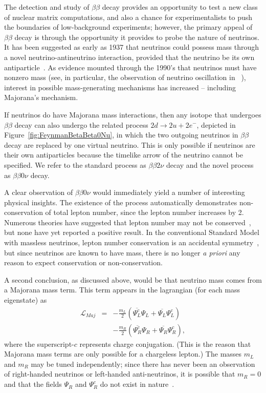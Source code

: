The detection and study of $\beta\beta$ decay provides an opportunity to test a new class of nuclear matrix computations, and also a chance for experimentalists to push the boundaries of low-background experiments; however, the primary appeal of $\beta\beta$ decay is through the opportunity it provides to probe the nature of neutrinos.  It has been suggested as early as 1937 that neutrinos could possess mass through a novel neutrino-antineutrino interaction, provided that the neutrino be its own antiparticle~\cite{Majorana}.  As evidence mounted through the 1990's that neutrinos must have nonzero mass (see, in particular, the observation of neutrino oscillation in ~\cite{SuperK}), interest in possible mass-generating mechanisms has increased -- including Majorana's mechanism.

If neutrinos do have Majorana mass interactions, then any isotope that undergoes $\beta\beta$ decay can also undergo the related process $2d \rightarrow 2u + 2e^-$, depicted in Figure~\ref{fig:FeynmanBetaBeta0Nu}, in which the two outgoing neutrinos in $\beta\beta$ decay are replaced by one virtual neutrino.  This is only possible if neutrinos are their own antiparticles because the timelike arrow of the neutrino cannot be specified.  We refer to the standard process as $\beta\beta 2\nu$ decay and the novel process as $\beta\beta 0\nu$ decay.

A clear observation of $\beta\beta 0\nu$ would immediately yield a number of interesting physical insights.  The existence of the process automatically demonstrates non-conservation of total lepton number, since the lepton number increases by 2.  Numerous theories have suggested that lepton number may not be conserved~\cite{ProtonDecay}\cite{MuonToPositron}, but none have yet reported a positive result.  In the conventional Standard Model with massless neutrinos, lepton number conservation is an accidental symmetry~\cite{LeptonConservation}, but since neutrinos are known to have mass, there is no longer \textit{a priori} any reason to expect conservation or non-conservation.

A second conclusion, as discussed above, would be that neutrino mass comes from a Majorana mass term.  This term appears in the lagrangian (for each mass eigenstate) as 
\begin{eqnarray*}
\mathcal{L}_{Maj}&=& -\frac{m_{L}}{2} \left( \overline{\Psi_L^c} \Psi_L^{} + \overline{\Psi_L^{}} \Psi_L^c \right)\\
                 & & -\frac{m_{R}}{2} \left( \overline{\Psi_R^c} \Psi_R^{} + \overline{\Psi_R^{}} \Psi_R^c \right),
\end{eqnarray*}
where the superscript-$c$ represents charge conjugation.  (This is the reason that Majorana mass terms are only possible for a chargeless lepton.)  The masses $m_L$ and $m_R$ may be tuned independently; since there has never been an observation of right-handed neutrinos or left-handed anti-neutrinos, it is possible that $m_R = 0$ and that the fields $\Psi_R^{}$ and $\Psi_R^c$ do not exist in nature~\cite{PDG}.


